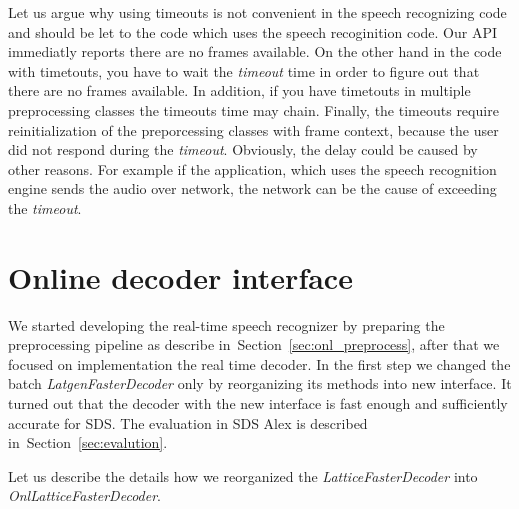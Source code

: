 Let us argue why using timeouts is not convenient in the speech recognizing code
and should be let to the code which uses the speech recoginition code.
Our \ac{API} immediatly reports there are no frames available.
On the other hand in the code with timetouts, you have to wait the {\it timeout}\/ time
in order to figure out that there are no frames available.
In addition, if you have timetouts in multiple preprocessing classes the timeouts time may chain.
Finally, the timeouts require reinitialization of the preporcessing classes with frame context,
because the user did not respond during the {\it timeout}\/. 
Obviously, the delay could be caused by other reasons. For example if the application, 
which uses the speech recognition engine sends the audio over network, the network can be
the cause of exceeding the {\it timeout}\/.

\section{Online decoder interface} 
\label{sec:improve}
We started developing the real-time speech recognizer by preparing the preprocessing
pipeline as describe in~Section~\ref{sec:onl_preprocess}, after that we focused 
on implementation the real time decoder. In the first step we changed 
the batch {\it LatgenFasterDecoder}\/ only by reorganizing its methods into new interface.
It turned out that the decoder with the new interface is 
fast enough and sufficiently accurate for \ac{SDS}. 
The evaluation in \ac{SDS} Alex is described in~Section~\ref{sec:evalution}.

Let us describe the details how we reorganized the {\it LatticeFasterDecoder}\/ 
into {\it OnlLatticeFasterDecoder}.

